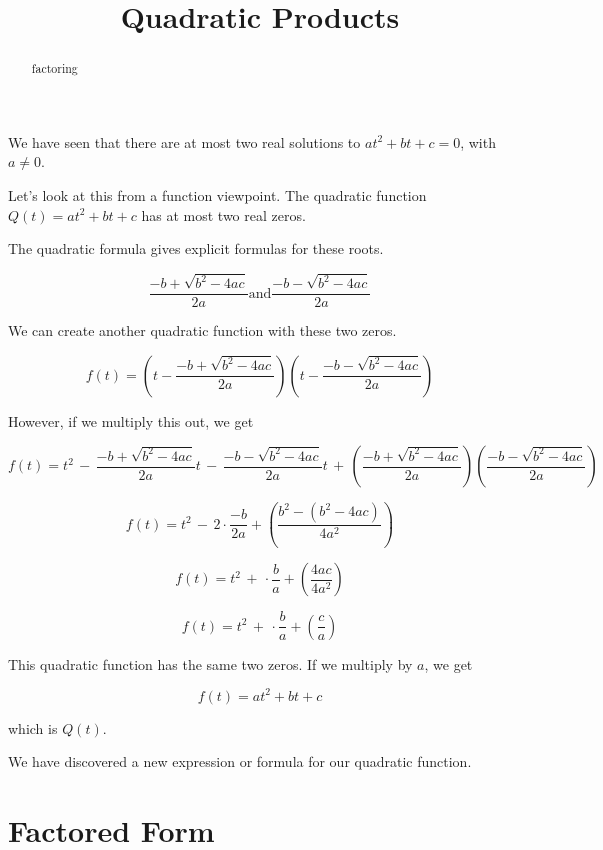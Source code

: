 \documentclass{ximera}
\title{Quadratic Products}
\begin{document}
\begin{abstract}
factoring
\end{abstract}
\maketitle





We have seen that there are at most two real solutions to $a t^2 + b t + c = 0$, with $a \ne 0$. 

Let's look at this from a function viewpoint.  The quadratic function  $Q(t) = a t^2 + b t + c$ has at most two real zeros.  

The quadratic formula gives explicit formulas for these roots.


\[   \frac{-b + \sqrt{b^2 - 4 a c}}{2a}     \text{and}    \frac{-b - \sqrt{b^2 - 4 a c}}{2a}   \]



We can create another quadratic function with these two zeros.



\[ f(t) =  \left(t - \frac{-b + \sqrt{b^2 - 4 a c}}{2a}\right)   \left(t -  \frac{-b - \sqrt{b^2 - 4 a c}}{2a}\right)   \]


However, if we multiply this out, we get



\[ f(t) =   t^2 \, - \, \frac{-b + \sqrt{b^2 - 4 a c}}{2a} t \, - \, \frac{-b - \sqrt{b^2 - 4 a c}}{2a}  t \, + \, \left(\frac{-b + \sqrt{b^2 - 4 a c}}{2a}\right) \left(\frac{-b - \sqrt{b^2 - 4 a c}}{2a}\right) \]


\[ f(t) = t^2  \, - \, 2 \cdot \frac{-b}{2a} + \left(    \frac{b^2 - (b^2 - 4 a c)}{4 a^2}     \right)        \]


\[ f(t) = t^2  \, + \, \cdot \frac{b}{a} + \left(    \frac{4 a c}{4 a^2}     \right)        \]

\[ f(t) = t^2  \, + \, \cdot \frac{b}{a} + \left(    \frac{c}{a}     \right)        \]


This quadratic function has the same two zeros.  If we multiply by $a$, we get 


\[ f(t) = a t^2 + b t + c \]

which is $Q(t)$.


We have discovered a new expression or formula for our quadratic function.



\section{Factored Form}
\end{document}

